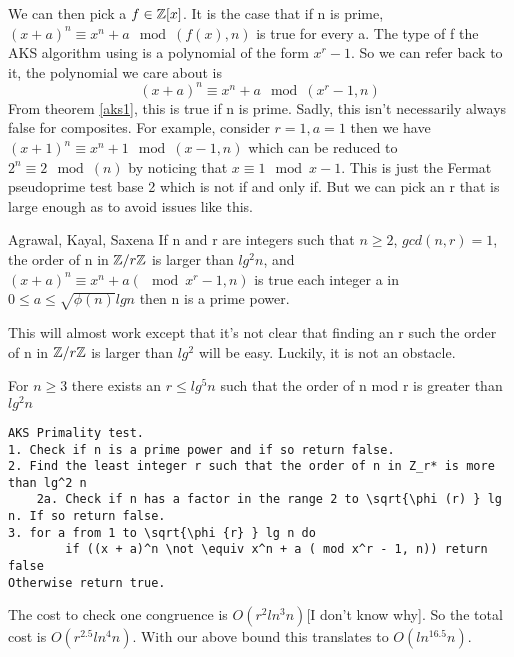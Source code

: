 \documentclass{article}
\begin{document}
We can then pick a $f \in \mathbb{Z} [x]$. It is the case that if n is prime, $(x+a)^n \equiv x^n + a \mod ( f(x), n)$ is true for every a. The type of f the AKS algorithm using is a polynomial of the form $x^r - 1$. So we can refer back to it, the polynomial we care about is 
\begin{equation}
    \label{aks2}
    (x+a)^n \equiv x^n + a \mod (x^r -1 , n)
\end{equation}
From theorem \ref{aks1}, this is true if n is prime. Sadly, this isn't necessarily always false for composites. For example, consider $r = 1, a = 1$ then we have $(x + 1)^n \equiv x^n + 1 \mod (x - 1, n)$ which can be reduced to $2^n \equiv 2 \mod (n)$ by noticing that $x \equiv 1 \mod x -1$. This is just the Fermat pseudoprime test base 2 which is not if and only if. But we can pick an r that is large enough as to avoid issues like this. 

\begin{theorem}{Agrawal, Kayal, Saxena \cite{PrimesP}}
    \label{aks3}
    If n and r are integers such that $n \geq 2$, $gcd(n , r) = 1$, the order of n in $\mathbb{Z} / r \mathbb{Z}$ is larger than $lg^2 n$, and $(x + a)^n \equiv x^n + a ( \mod x^r - 1, n)$ is true each integer a in $ 0 \leq a \leq \sqrt{\phi(n)} lg n$ then n is a prime power. 
\end{theorem}

This will almost work except that it's not clear that finding an r such the order of n in $\mathbb{Z} / r \mathbb{Z}$ is larger than $lg^2$ will be easy. Luckily, it is not an obstacle. 
\begin{theorem}
    For $n \geq 3$ there exists an $r \leq lg^5 n$ such that the order of n mod r is greater than $lg^2 n$
\end{theorem}

\begin{verbatim}
AKS Primality test.
1. Check if n is a prime power and if so return false.
2. Find the least integer r such that the order of n in Z_r* is more than lg^2 n
    2a. Check if n has a factor in the range 2 to \sqrt{\phi (r) } lg n. If so return false.
3. for a from 1 to \sqrt{\phi {r} } lg n do
        if ((x + a)^n \not \equiv x^n + a ( mod x^r - 1, n)) return false
Otherwise return true.
\end{verbatim}
The cost to check one congruence is $O(r^2 ln^3 n)$[I don't know why]. So the total cost is $O(r^{2.5} ln^4 n)$. With our above bound this translates to $O(ln^{16.5} n)$. 
\end{document}
